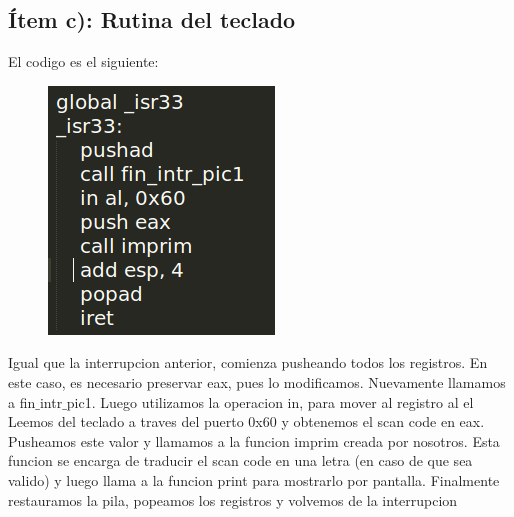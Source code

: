 \subsection{Ítem c): Rutina del teclado}

El codigo es el siguiente:
\begin{figure}[H]
\begin{center}
  \includegraphics[width=\linewidth]{ejercicio5/rutinaTeclado.png}
\endminipage
\end{center}
\end{figure}

Igual que la interrupcion anterior, comienza pusheando todos los registros. En este caso, es necesario preservar eax, pues lo modificamos. Nuevamente llamamos a fin$\_$intr$\_$pic1. Luego utilizamos la operacion in, para mover al registro al el 
Leemos del teclado a traves del puerto 0x60 y obtenemos el scan code en eax. Pusheamos este valor y llamamos a la funcion imprim creada por nosotros. Esta funcion se encarga de traducir el scan code en una letra (en caso de que sea valido) y luego llama a la funcion print para mostrarlo por pantalla. Finalmente restauramos la pila, popeamos los registros y volvemos de la interrupcion

